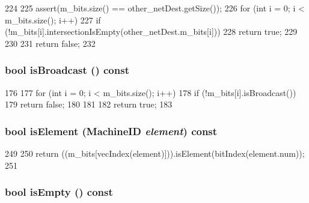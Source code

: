 \begin{DoxyCode}
224 {
225     assert(m_bits.size() == other_netDest.getSize());
226     for (int i = 0; i < m_bits.size(); i++) {
227         if (!m_bits[i].intersectionIsEmpty(other_netDest.m_bits[i])) {
228             return true;
229         }
230     }
231     return false;
232 }
\end{DoxyCode}
\hypertarget{classNetDest_ad6e06804cf170a9f5925776696c32060}{
\subsubsection[{isBroadcast}]{\setlength{\rightskip}{0pt plus 5cm}bool isBroadcast () const}}
\label{classNetDest_ad6e06804cf170a9f5925776696c32060}



\begin{DoxyCode}
176 {
177     for (int i = 0; i < m_bits.size(); i++) {
178         if (!m_bits[i].isBroadcast()) {
179             return false;
180         }
181     }
182     return true;
183 }
\end{DoxyCode}
\hypertarget{classNetDest_a906c9c311078ad8acf27e8920e44030d}{
\subsubsection[{isElement}]{\setlength{\rightskip}{0pt plus 5cm}bool isElement ({\bf MachineID} {\em element}) const}}
\label{classNetDest_a906c9c311078ad8acf27e8920e44030d}



\begin{DoxyCode}
249 {
250     return ((m_bits[vecIndex(element)])).isElement(bitIndex(element.num));
251 }
\end{DoxyCode}
\hypertarget{classNetDest_a479432127ee77145cc19d6a2d1590821}{
\subsubsection[{isEmpty}]{\setlength{\rightskip}{0pt plus 5cm}bool isEmpty () const}}
\label{classNetDest_a479432127ee77145cc19d6a2d1590821}



